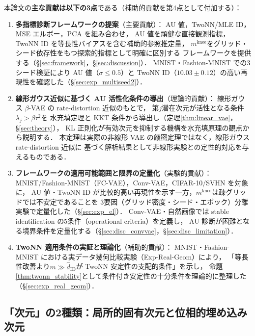 \documentclass[11pt,a4paper]{jsarticle}
\newcommand{\mknee}{m^{\mathrm{knee}}}
\begin{document}
本論文の\textbf{主な貢献は以下の3点}である（補助的貢献を第4点として付加する）：
\begin{enumerate}
  \item \textbf{多指標診断フレームワークの提案}（主要貢献）：
        AU 値，TwoNN/MLE ID，MSE エルボー，PCA を組み合わせ，
        AU 値を頑健な直接観測指標，TwoNN ID を等長性バイアスを含む補助的参照推定量，
        $\mknee$をグリッド・シード依存性をもつ探索的指標として明確に区別する
        フレームワークを提供する（§\ref{sec:framework}，§\ref{sec:discussion}）．
        MNIST・Fashion-MNIST での3シード検証により AU 値（$\sigma \leq 0.5$）と
        TwoNN ID（$10.03 \pm 0.12$）の高い再現性を確認した（§\ref{sec:exp_multiseed2}）．
  \item \textbf{線形ガウス近似に基づく AU 活性化条件の導出}（理論的貢献）：
        線形ガウス $\beta$-VAE の rate-distortion 近似のもとで，
        第$j$潜在次元が活性となる条件$\lambda_j > \beta\tau^2$を
        水充填定理と KKT 条件から導出し（定理\ref{thm:linear_vae}，§\ref{sec:theory}），
        KL 正則化が有効次元を抑制する機構を水充填原理の観点から説明する．
        本定理は実際の非線形 VAE の厳密定理ではなく，線形ガウス rate-distortion 近似に
        基づく解析結果として非線形実験との定性的対応を与えるものである．
  \item \textbf{フレームワークの適用可能範囲と限界の定量化}（実験的貢献）：
        MNIST/Fashion-MNIST（FC-VAE），Conv-VAE，CIFAR-10/SVHN を対象に，
        AU 値・TwoNN ID が比較的高い再現性を示す一方，$\mknee$は疎グリッドでは不安定であることを
        3要因（グリッド密度・シード・エポック）分離実験で定量化した（§\ref{sec:exp_el}）．
        Conv-VAE・自然画像では stable identification の5条件（operational criteria）を定義し，
        AU 診断が困難となる境界条件を定量化する（§\ref{sec:disc_convvae}，§\ref{sec:disc_limitation}）．
  \item \textbf{TwoNN 適用条件の実証と理論化}（補助的貢献）：
        MNIST・Fashion-MNIST における実データ幾何比較実験（Exp-Real-Geom）により，
        「等長性改善より$m \gg \hat{d}_\mathrm{ID}$が TwoNN 安定性の支配的条件」を示し，
        命題\ref{thm:twonn_stability}として条件付き安定性の十分条件を理論的に整理した（§\ref{sec:exp_real_geom}）．
\end{enumerate}

\subsection{「次元」の2種類：局所的固有次元と位相的埋め込み次元}\label{sec:intro_dim}
\end{document}
